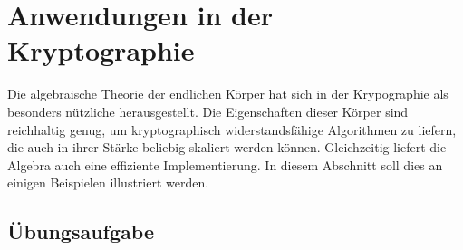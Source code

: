 %
%
%
\chapter{Anwendungen in der Kryptographie
\label{buch:chapter:kryptographie}}
\rhead{}
Die algebraische Theorie der endlichen Körper hat sich
in der Krypographie als besonders nützliche herausgestellt.
Die Eigenschaften dieser Körper sind reichhaltig genug, um 
kryptographisch widerstandsfähige Algorithmen zu liefern, die
auch in ihrer Stärke beliebig skaliert werden können.
Gleichzeitig liefert die Algebra auch eine effiziente Implementierung.
In diesem Abschnitt soll dies an einigen Beispielen illustriert werden.





%

\section*{Übungsaufgabe}
\begin{uebungsaufgaben}
\end{uebungsaufgaben}

